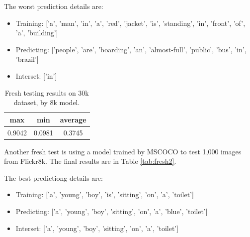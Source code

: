 \documentclass[10pt,twocolumn,letterpaper]{article}
\begin{document}
The worst prediction details are:
\begin{itemize}
    \item Training: ['a', 'man', 'in', 'a', 'red', 'jacket', 'is', 'standing', 'in', 'front', 'of', 'a', 'building']
    \item Predicting: ['people', 'are', 'boarding', 'an', 'almost-full', 'public', 'bus', 'in', 'brazil']
    \item Interset: ['in']

\end{itemize}
\begin{table}[]
\centering
\begin{tabular}{ccc}
\hline
max    & min    & average \\ \hline
0.9042 & 0.0981 & 0.3745  \\ \hline
\end{tabular}
\caption{Fresh testing results on 30k dataset, by 8k model.}
\label{tab:fresh1}
\end{table}

Another fresh test is using a model trained by MSCOCO to test 1,000 images from Flickr8k.
The final results are in Table \ref{tab:fresh2}.

The best predictiong details are:
\begin{itemize}
    \item Training: ['a', 'young', 'boy', 'is', 'sitting', 'on', 'a', 'toilet']
    \item Predicting: ['a', 'young', 'boy', 'sitting', 'on', 'a', 'blue', 'toilet']
    \item Interset: ['a', 'young', 'boy', 'sitting', 'on', 'a', 'toilet']
\end{itemize}
\end{document}

